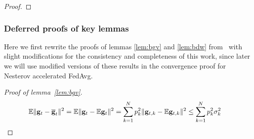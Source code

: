 \begin{proof}
\begin{comment}
	\begin{align*}
	(1-\mu\alpha_{t-1})\alpha_{t-1}^{2}+(1-\mu\alpha_{t})(1-\mu\alpha_{t-1})b\alpha_{t-1} & \leq(1-\mu\alpha_{t})\alpha_{t-1}^{2}+(1-\mu\alpha_{t})(1-\mu\alpha_{t-1})b\alpha_{t-1}\\
	& \le(1-\mu\alpha_{t})\alpha_{t-1}(\alpha_{t-1}+(1-\mu\alpha_{t-1})b)\\
	& \leq(1-\mu\alpha_{t})b\alpha_{t}
	\end{align*}
	so that 
	\begin{align*}
	(1-\mu\alpha_{t})\beta\alpha_{t}+\alpha_{t}^{2} & \leq b\alpha_{t+1}\\
	\end{align*}
	\begin{align*}
	(1-\mu\alpha_{t-1})\alpha_{t-1}^{2}+(1-\mu\alpha_{t})(1-\mu\alpha_{t-1})b\alpha_{t-1} & \leq\alpha_{t}^{2}+(1-\mu\alpha_{t-1})\alpha_{t-1}(\alpha_{t-1}+b(1-\mu\alpha_{t}))\le\\
	(\alpha_{t-1}+b(1-\mu\alpha_{t}))\alpha_{t}\leq
	\end{align*}
	\end{proof}
	\end{comment}
\end{proof}

\subsubsection{Deferred proofs of key lemmas}
Here we first rewrite the proofs of lemmas \ref{lem:bgv} and  \ref{lem:bdw} from~\cite{li2019convergence} with slight modifications for the consistency and completeness of this work, since later we will use modified versions of these results in the convergence proof for Nesterov accelerated FedAvg.
\begin{proof}[Proof of lemma~\ref{lem:bgv}]
	\begin{align*}
	\mathbb{E}\|{\mathbf{g}}_{t}-{\overline{\mathbf{g}}}_{t}\|^{2} & =\mathbb{E}\|{\mathbf{g}}_{t}-\mathbb{E}{\mathbf{g}}_{t}\|^{2}=\sum_{k=1}^{N}p_{k}^{2}\|{\mathbf{g}}_{t,k}-\mathbb{E}{\mathbf{g}}_{t,k}\|^{2}\leq \sum_{k=1}^{N}p_{k}^{2}\sigma_{k}^{2}
	\end{align*}
\end{proof}


